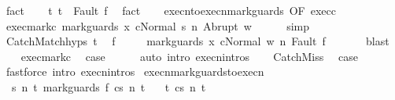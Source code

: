 \begin{isabellebody}
\ fact\isanewline
\ \ \isamarkupfalse%
\ t{\isacharcolon}\ {\isachardoublequoteopen}t\ {\isacharequal}\ Fault\ f{\isachardoublequoteclose}\ \isamarkupfalse%
\ fact\isanewline
\ \ \isamarkupfalse%
\ execn{\isacharunderscore}to{\isacharunderscore}execn{\isacharunderscore}mark{\isacharunderscore}guards\ {\isacharbrackleft}OF\ exec{\isacharunderscore}c{}{\isacharbrackright}\isanewline
\ \ \isamarkupfalse%
\ exec{\isacharunderscore}mark{\isacharunderscore}c{}{\isacharcolon}\ {\isachardoublequoteopen}{\isasymGamma}{\isasymturnstile}{\isasymlangle}mark{\isacharunderscore}guards\ x\ c{}{\isacharcomma}Normal\ s{\isasymrangle}\ {\isacharequal}n{\isasymRightarrow}\ Abrupt\ w{\isachardoublequoteclose}\isanewline
\ \ \ \ \isamarkupfalse%
\ simp\isanewline
\ \ \isamarkupfalse%
\ CatchMatch{\isachardot}hyps\ t\ \isamarkupfalse%
\ f{\isacharprime}\ \isanewline
\ \ \ \ {\isachardoublequoteopen}{\isasymGamma}{\isasymturnstile}{\isasymlangle}mark{\isacharunderscore}guards\ x\ c{}{\isacharcomma}Normal\ w{\isasymrangle}\ {\isacharequal}n{\isasymRightarrow}\ Fault\ f{\isacharprime}{\isachardoublequoteclose}\ \isanewline
\ \ \ \ \isamarkupfalse%
\ blast\isanewline
\ \ \isamarkupfalse%
\ exec{\isacharunderscore}mark{\isacharunderscore}c{}\ \isamarkupfalse%
\ {\isacharquery}case\isanewline
\ \ \ \ \isamarkupfalse%
\ {\isacharparenleft}auto\ intro{\isacharcolon}\ execn{\isachardot}intros{\isacharparenright}\isanewline
{}\isamarkupfalse%
\isanewline
\ \ \isamarkupfalse%
\ CatchMiss\ \isamarkupfalse%
\ {\isacharquery}case\ \isamarkupfalse%
\ {\isacharparenleft}fastforce\ intro{\isacharcolon}\ execn{\isachardot}intros{\isacharparenright}\isanewline
{}\isamarkupfalse%
%
\endisatagproof
{\isafoldproof}%
%
\isadelimproof
\isanewline
%
\endisadelimproof
\isanewline
{}\isamarkupfalse%
\ execn{\isacharunderscore}mark{\isacharunderscore}guards{\isacharunderscore}to{\isacharunderscore}execn{\isacharcolon}\isanewline
\ \ {\isachardoublequoteopen}{\isasymAnd}s\ n\ t{\isachardot}\ {\isasymGamma}{\isasymturnstile}{\isasymlangle}mark{\isacharunderscore}guards\ f\ c{\isacharcomma}s{\isasymrangle}\ {\isacharequal}n{\isasymRightarrow}\ t\isanewline
\ \ {\isasymLongrightarrow}\ {\isasymexists}t{\isacharprime}{\isachardot}\ {\isasymGamma}{\isasymturnstile}{\isasymlangle}c{\isacharcomma}s{\isasymrangle}\ {\isacharequal}n{\isasymRightarrow}\ t{\isacharprime}\ {\isasymand}\ \isanewline

\end{isabellebody}
